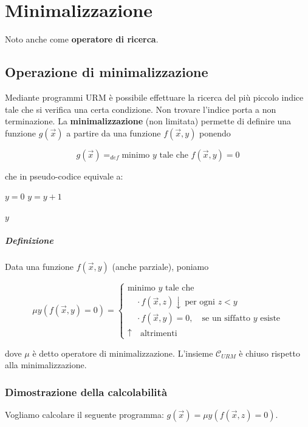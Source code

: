 	\chapter{Minimalizzazione}
	Noto anche come \textbf{operatore di ricerca}.
	
	\section{Operazione di minimalizzazione}
	Mediante programmi URM è possibile effettuare la ricerca del più piccolo indice tale che si verifica una certa condizione. Non trovare l'indice porta a non terminazione.
	La \textbf{minimalizzazione} (non limitata) permette di definire una funzione $g(\vec{x})$ a partire da una funzione $f(\vec{x}, y)$ ponendo 
	
	$$
	g(\vec{x}) =_{def} \text{minimo $y$ tale che } f(\vec{x},y) = 0
	$$
	
	che in pseudo-codice equivale a:
	
		\begin{algorithm}
		\caption{Minimalizzazione in pseudocodice}
		\begin{algorithmic}
			\State $y = 0$
				\State $y = y+1$
			\EndWhile
			
			\State \Return $y$
		\end{algorithmic}
	\end{algorithm}
	
	\paragraph{Definizione} 
	Data una funzione $f(\vec{x},y)$ (anche parziale), poniamo
	
	$$
	\mu y ( f(\vec{x},y) = 0 )
	=
	\begin{cases}
		\text{minimo } y \text{ tale che} \\[4pt]
		\quad \cdot f(\vec{x},z)\downarrow \ \text{per ogni } z < y \\[4pt]
		\quad \cdot f(\vec{x},y) = 0, 
		\quad \text{se un siffatto } y \text{ esiste} \\[8pt]
		\uparrow \quad \text{altrimenti}
	\end{cases}
	$$
	
	dove $\mu$ è detto operatore di minimalizzazione. L'insieme $\mathcal C_{URM}$ è chiuso rispetto alla minimalizzazione.
	
	\subsection{Dimostrazione della calcolabilità}
	Vogliamo calcolare il seguente programma: $g(\vec{x}) = \mu y(f(\vec{x},z) = 0)$.
	
